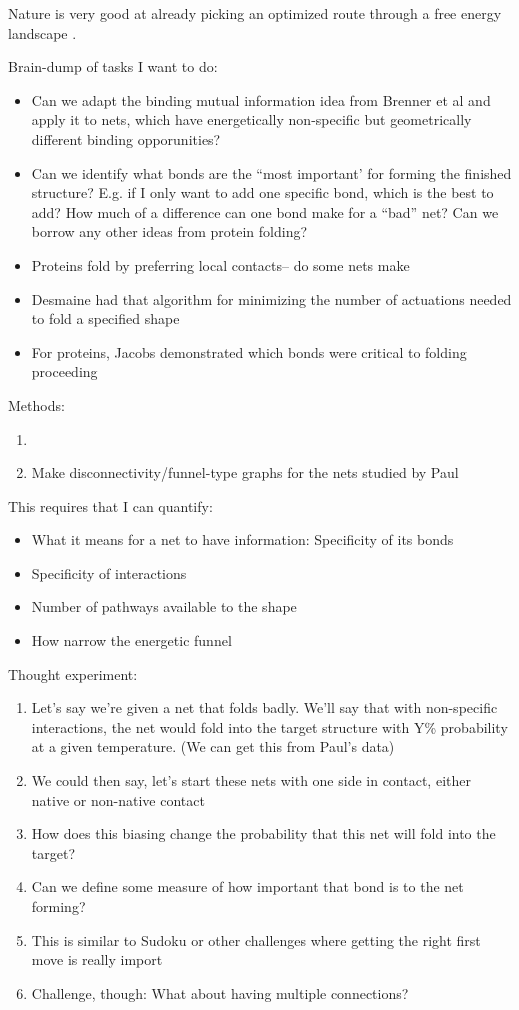 Nature is very good at already picking an optimized route through a free energy landscape \cite{Jacobs_2016_BiophysicalJournal}.

Brain-dump of tasks I want to do:
\begin{itemize}
\item Can we adapt the binding mutual information idea from Brenner et al and apply it to nets, which have energetically non-specific but geometrically different binding opporunities?
\item Can we identify what bonds are the ``most important' for forming the finished structure? E.g. if I only want to add one specific bond, which is the best to add? How much of a difference can one bond make for a ``bad'' net? Can we borrow any other ideas from protein folding?
\item Proteins fold by preferring local contacts-- do some nets make 
\item Desmaine had that algorithm for minimizing the number of actuations needed to fold a specified shape
\item For proteins, Jacobs demonstrated which bonds were critical to folding proceeding \cite{Jacobs_2016_BiophysicalJournal}
\end{itemize}

Methods:
\begin{enumerate}
\item \item Make disconnectivity/funnel-type graphs for the nets studied by Paul
\end{enumerate}

This requires that I can quantify:
\begin{itemize}
\item What it means for a net to have information: Specificity of its bonds
\item Specificity of interactions
\item Number of pathways available to the shape
\item How narrow the energetic funnel 
\end{itemize}

Thought experiment:
\begin{enumerate}
\item Let's say we're given a net that folds badly. We'll say that with non-specific interactions, the net would fold into the target structure with Y\% probability at a given temperature. (We can get this from Paul's data)
\item We could then say, let's start these nets with one side in contact, either native or non-native contact
\item How does this biasing change the probability that this net will fold into the target?
\item Can we define some measure of how important that bond is to the net forming?
\item This is similar to Sudoku or other challenges where getting the right first move is really import
\item Challenge, though: What about having multiple connections?
\end{enumerate}


